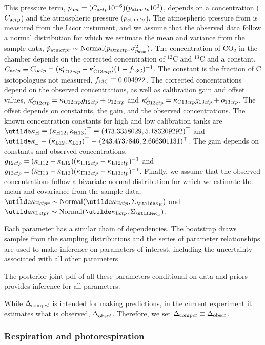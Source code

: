 \documentclass[12pt]{article}
\begin{document}
This pressure term,
  $p_{\textrm{a}ct} = (C_{\textrm{a}ctp} 10^{-6})(p_{\textrm{atm}ctp} 10^3)$,
  depends on a concentration ($C_{\textrm{a}ctp}$) and the atmospheric pressure ($p_{\textrm{atm}ctp}$).
The atmospheric pressure from is measured from the Licor instument,
  and we assume that the observed data follow a normal distribution
  for which we estimate the mean and variance from the sample data,
    $\tilde{p}_{\textrm{atm}ctpr} \sim \textrm{Normal}(p_{\textrm{atm}ctp},\sigma_{p_{\textrm{atm}}}^2)$.
The concentration of CO$_2$ in the chamber depends on
  the corrected concentration of $^{12}$C and $^{13}$C and a constant,
  $C_{\textrm{a}ctp} \equiv C_{\textrm{o}ctp} = (\kappa_{\textrm{C}12ctp}^{\prime}+\kappa_{\textrm{C}13ctp}^{\prime})(1-\dot{f}_{\textrm{13C}})^{-1}$.
The constant is the fraction of C isotopologues not measured, $\dot{f}_{\textrm{13C}}\equiv 0.004922$.
The corrected concentrations depend on the observed concentrations,
  as well as calibration gain and offset values,
  $\kappa_{\textrm{C}12ctp}^{\prime} = \kappa_{\textrm{C}12ctp}g_{\textrm{12}ctp} + o_{\textrm{12}ctp}$ and
  $\kappa_{\textrm{C}13ctp}^{\prime} = \kappa_{\textrm{C}13ctp}g_{\textrm{13}ctp} + o_{\textrm{13}ctp}$.
The offset depends on constatnts, the gain, and the observed concentrations.
The known concentration constants for high and low calibration tanks are
  $\vdotkappaHtw
    \equiv (\sdotkappaHtw, \sdotkappaHth)^\transpose
    \equiv (473.3358029, 5.183209292)^\transpose      $ and
  $\vdotkappaLtw
    \equiv (\sdotkappaLtw, \sdotkappaLth)^\transpose
    \equiv (243.4737846, 2.666301131)^\transpose      $.
The gain depends on constants and observed concentrations,
  $g_{\textrm{12}ctp} = (\dot{\kappa}_{\textrm{H}12} - \dot{\kappa}_{\textrm{L}12})(\kappa_{\textrm{H}12ctp} - \kappa_{\textrm{L}12ctp})^{-1}$ and
  $g_{\textrm{13}ctp} = (\dot{\kappa}_{\textrm{H}13} - \dot{\kappa}_{\textrm{L}13})(\kappa_{\textrm{H}13ctp} - \kappa_{\textrm{L}13ctp})^{-1}$.
Finally, we assume that the observed concentrations follow a bivariate normal distribution
  for which we estimate the mean and covariance from the sample data,
  $\vdatakappaH \sim \Normal(\vkappaH,\vsigkappaH)$ and
  $\vdatakappaL \sim \Normal(\vkappaL,\vsigkappaL)$.

Each parameter has a similar chain of dependencies.
The bootstrap draws samples from the sampling distributions
  and the series of parameter relationships are used to make inference
  on parameters of interest, including the uncertainty associated with all other parameters.


The posterior joint pdf of all these parameters
  conditional on data and priors
  provides inference for all parameters.

While $\Delta_{\textrm{comp}ct}$ is intended for making predictions,
  in the current experiment it estimates what is observed,
  $\Delta_{\textrm{obs}ct}$.
Therefore, we set $\Delta_{\textrm{comp}ct}\equiv\Delta_{\textrm{obs}ct}$.

\subsubsection{Respiration and photorespiration}
\end{document}
